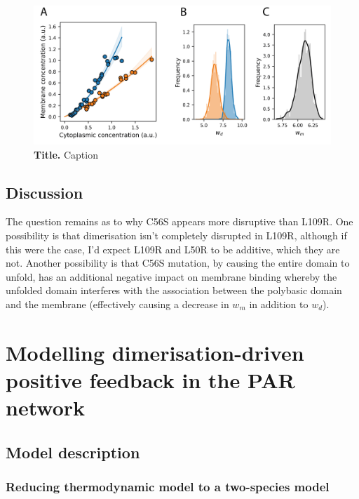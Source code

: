 \documentclass[12pt]{"article"}
\newcommand{\mycaption}[2]{\caption[#1]{\textbf{#1.} #2}}
\begin{document}
\begin{figure}[!h]
\includegraphics[scale=1]{thermodynamic_model_wt_vs_l109r}
\setlength{\abovecaptionskip}{20pt}
\centering
\mycaption{Title}{Caption}
\label{fig:thermodynamic_model_wt_vs_l109r}
\end{figure}


\subsection{Discussion}


The question remains as to why C56S appears more disruptive than L109R. One possibility is that dimerisation isn’t completely disrupted in L109R, although if this were the case, I’d expect L109R and L50R to be additive, which they are not. Another possibility is that C56S mutation, by causing the entire domain to unfold, has an additional negative impact on membrane binding whereby the unfolded domain interferes with the association between the polybasic domain and the membrane (effectively causing a decrease in $w_m$ in addition to $w_d$).\\

\clearpage
\section{Modelling dimerisation-driven positive feedback in the PAR network}

\subsection{Model description}

\subsubsection{Reducing thermodynamic model to a two-species model} 
\end{document}
